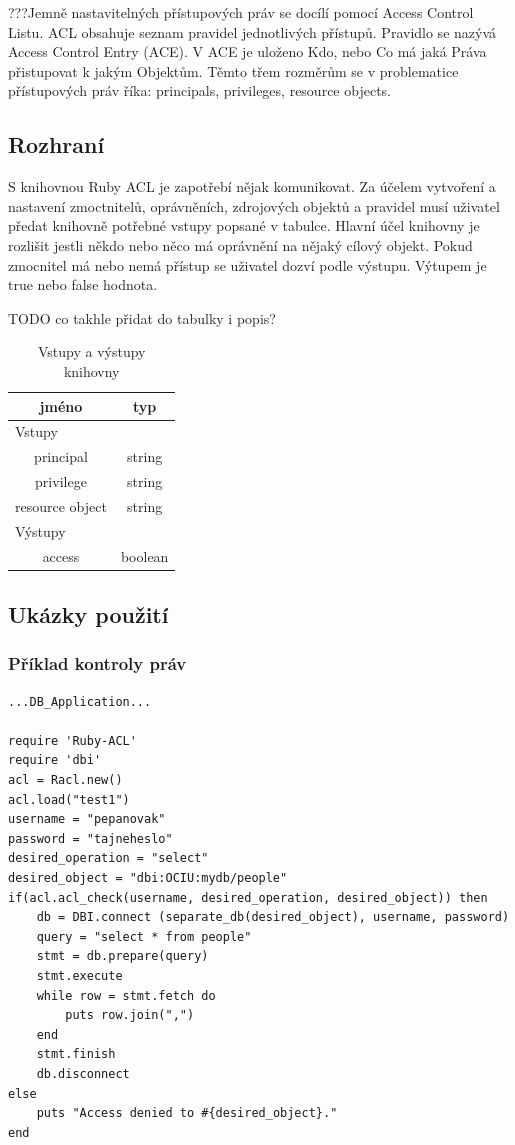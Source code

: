 \documentclass[11pt,twoside,a4paper]{book}
\begin{document}
???Jemně nastavitelných přístupových práv se docílí pomocí Access Control Listu. ACL obsahuje seznam pravidel jednotlivých přístupů. Pravidlo se nazývá Access Control Entry (ACE). V ACE je uloženo Kdo, nebo Co má jaká Práva přistupovat k jakým Objektům. Těmto třem rozměrům se v problematice přístupových práv říka: principals, privileges, resource objects.



\subsection{Rozhraní}

S knihovnou Ruby ACL je zapotřebí nějak komunikovat. Za účelem vytvoření a nastavení zmoctnitelů, oprávněních, zdrojových objektů a pravidel musí uživatel předat knihovně potřebné vstupy popsané v tabulce. Hlavní účel knihovny je rozlišit jestli někdo nebo něco má oprávnění na nějaký cílový objekt. Pokud zmocnitel má nebo nemá přístup se uživatel dozví podle výstupu. Výtupem je true nebo false hodnota.

TODO co takhle přidat do tabulky i popis?

\begin{table}%
\centering
\begin{tabular}{|c|c|}
\hline
\textbf{jméno} & \textbf{typ} \\
\hline
\multicolumn{2}{|l|}{Vstupy} \\
\hline
principal & string\\
\hline
privilege & string\\
\hline
resource object & string\\
\hline
\hline
\multicolumn{2}{|l|}{Výstupy} \\
\hline
access & boolean\\
\hline
\end{tabular}
\caption{Vstupy a výstupy knihovny}
\end{table}

\subsection{Ukázky použití}
\subsubsection{Příklad kontroly práv}
\begin{verbatim}
...DB_Application...

require 'Ruby-ACL'
require 'dbi'
acl = Racl.new()
acl.load("test1")
username = "pepanovak"
password = "tajneheslo"
desired_operation = "select"
desired_object = "dbi:OCIU:mydb/people"
if(acl.acl_check(username, desired_operation, desired_object)) then
	db = DBI.connect (separate_db(desired_object), username, password)
	query = "select * from people"
	stmt = db.prepare(query)
	stmt.execute
	while row = stmt.fetch do
		puts row.join(",")
	end
	stmt.finish
	db.disconnect
else
	puts "Access denied to #{desired_object}."
end
\end{verbatim}
\end{document}

